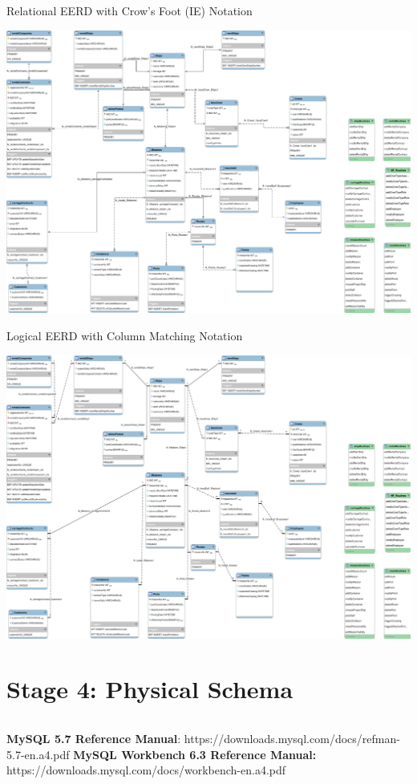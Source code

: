 \documentclass[10pt]{report}
\begin{document}
\begin{inlinefigure}{Relational EERD with Crow's Foot (IE) Notation}
	\begin{center}
		\includegraphics[height=\textheight, width=\textwidth]{MercantileShips-EER.pdf}
	\end{center}
\end{inlinefigure}
\newpage
\begin{inlinefigure}{Logical EERD with Column Matching Notation }
	\begin{center}
		\includegraphics[height=\textheight, width=\textwidth]{MercantileShips-EER-Logical.pdf}
	\end{center}
\end{inlinefigure}


\newpage
\chapter*{Stage 4: Physical Schema}
\inputminted[breaklines=true, fontsize=\footnotesize]{mysql}{../src/NavibusMercatoriis.sql}
\newpage
\begin{thebibliography}{}
		\textbf{MySQL 5.7 Reference Manual}: https://downloads.mysql.com/docs/refman-5.7-en.a4.pdf
		\textbf{MySQL Workbench 6.3 Reference Manual:} https://downloads.mysql.com/docs/workbench-en.a4.pdf
\end{thebibliography}
\end{document}
